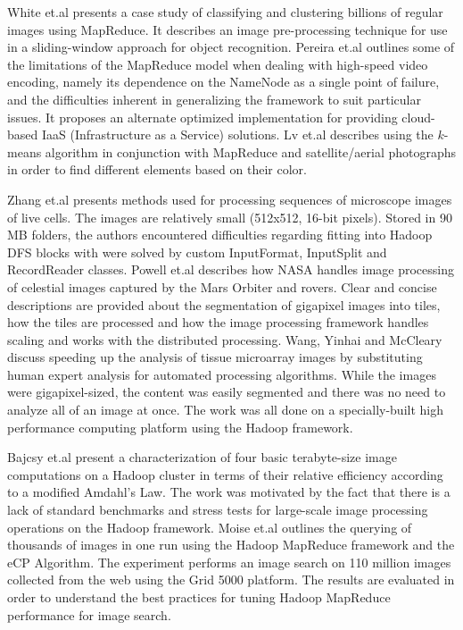 White et.al \cite{White2010} presents a case study of classifying and
clustering billions of regular images using MapReduce.  It describes
an image pre-processing technique for use in a sliding-window approach
for object recognition.  Pereira et.al \cite{Pereira2010} outlines
some of the limitations of the MapReduce model when dealing with
high-speed video encoding, namely its dependence on the NameNode as a
single point of failure, and the difficulties inherent in generalizing
the framework to suit particular issues.  It proposes an alternate
optimized implementation for providing cloud-based IaaS
(Infrastructure as a Service) solutions.  Lv et.al \cite{Lv2010}
describes using the $k$-means algorithm in conjunction with MapReduce
and satellite/aerial photographs in order to find different elements
based on their color.

Zhang et.al \cite{Zhang2010} presents methods used for processing
sequences of microscope images of live cells. The images are
relatively small (512x512, 16-bit pixels).  Stored in 90 MB folders,
the authors encountered difficulties regarding fitting into Hadoop DFS
blocks with were solved by custom InputFormat, InputSplit and
RecordReader classes.  Powell et.al \cite{Powell2010} describes how
NASA handles image processing of celestial images captured by the Mars
Orbiter and rovers. Clear and concise descriptions are provided about
the segmentation of gigapixel images into tiles, how the tiles are
processed and how the image processing framework handles scaling and
works with the distributed processing. Wang, Yinhai and
McCleary\cite{Wang2011} discuss speeding up the analysis of tissue
microarray images by substituting human expert analysis for automated
processing algorithms. While the images were gigapixel-sized, the
content was easily segmented and there was no need to analyze all of
an image at once. The work was all done on a specially-built high
performance computing platform using the Hadoop framework.

Bajcsy et.al \cite{Bajcsy2013} present a characterization of four
basic terabyte-size image computations on a Hadoop cluster in terms of
their relative efficiency according to a modified Amdahl's Law. The
work was motivated by the fact that there is a lack of standard
benchmarks and stress tests for large-scale image processing
operations on the Hadoop framework. Moise et.al \cite{Moise2013}
outlines the querying of thousands of images in one run using the
Hadoop MapReduce framework and the eCP Algorithm. The experiment
performs an image search on 110 million images collected from the web
using the Grid 5000 platform. The results are evaluated in order to
understand the best practices for tuning Hadoop MapReduce performance
for image search.

